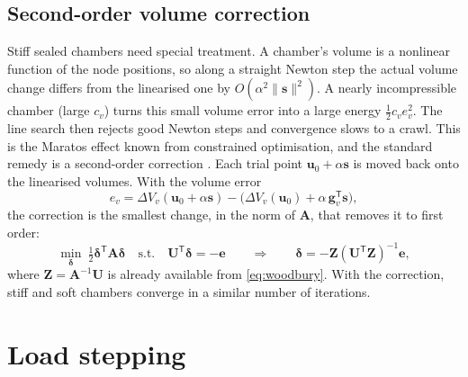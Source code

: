 \documentclass[11pt,a4paper]{article}
\newcommand{\vect}[1]{\bm{#1}}
\newcommand{\uu}{\vect{u}}
\newcommand{\g}{\vect{g}}
\newcommand{\dV}{\Delta V}
\theoremstyle{remark}
\begin{document}
\subsection{Second-order volume correction}

Stiff sealed chambers need special treatment. A chamber's volume is a nonlinear function of the
node positions, so along a straight Newton step the actual volume change differs from the
linearised one by $O(\alpha^2\|\vect{s}\|^2)$. A nearly incompressible chamber (large $c_v$) turns
this small volume error into a large energy $\tfrac12 c_v e_v^2$. The line search then rejects
good Newton steps and convergence slows to a crawl. This is the Maratos effect known from
constrained optimisation, and the standard remedy is a second-order correction
\cite{nocedal2006}. Each trial point $\uu_0 + \alpha\vect{s}$ is moved back onto the linearised
volumes. With the volume error
\begin{equation}
e_v = \dV_v(\uu_0+\alpha\vect{s}) - \big(\dV_v(\uu_0) + \alpha\,\g_v^{\mathsf T}\vect{s}\big),
\end{equation}
the correction is the smallest change, in the norm of $\mathbf{A}$, that removes it to first
order:
\begin{equation}
\min_{\boldsymbol\delta}\ \tfrac12\boldsymbol\delta^{\mathsf T}\mathbf{A}\boldsymbol\delta
\quad\text{s.t.}\quad \mathbf{U}^{\mathsf T}\boldsymbol\delta = -\vect{e}
\qquad\Longrightarrow\qquad
\boldsymbol\delta = -\mathbf{Z}\left(\mathbf{U}^{\mathsf T}\mathbf{Z}\right)^{-1}\vect{e},
\end{equation}
where $\mathbf{Z} = \mathbf{A}^{-1}\mathbf{U}$ is already available from \eqref{eq:woodbury}. With
the correction, stiff and soft chambers converge in a similar number of iterations.

\section{Load stepping}\label{sec:loadstep}
\end{document}
